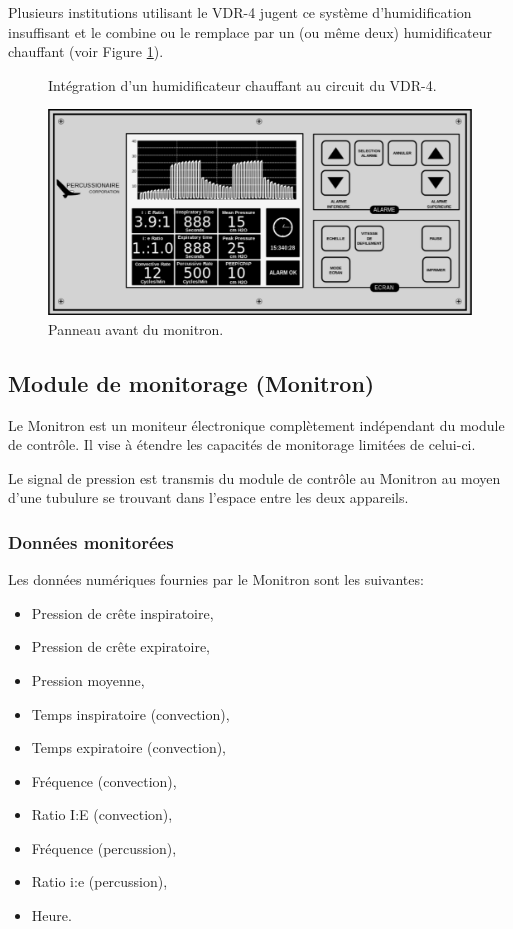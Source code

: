 Plusieurs institutions utilisant le VDR-4 jugent ce système 
d'humidification insuffisant et le combine ou le remplace par un 
(ou même deux) humidificateur chauffant (voir Figure \ref{fig:circ}).

\begin{figure}
	\begin{wide}
	
	\caption{Intégration d'un humidificateur chauffant au circuit du VDR-4.}
	\label{fig:circ}
	\end{wide}
\end{figure}

\begin{figure}
	\includegraphics[width=\textwidth]{img/Monitron}
	\caption{Panneau avant du monitron.}
\end{figure}
\subsection{Module de monitorage (Monitron)}

Le Monitron est un moniteur électronique complètement indépendant du
module de contrôle. Il vise à étendre les capacités de monitorage
limitées de celui-ci.

Le signal de pression est transmis du module de contrôle au Monitron
au moyen d'une tubulure se trouvant dans l'espace entre les deux
appareils.

\subsubsection{Données monitorées}

Les données numériques fournies par le Monitron sont les suivantes:

\begin{itemize}
\item Pression de crête inspiratoire,
\item Pression de crête expiratoire,
\item Pression moyenne,
\item Temps inspiratoire (convection),
\item Temps expiratoire (convection),
\item Fréquence (convection),
\item Ratio I:E (convection),
\item Fréquence (percussion),
\item Ratio i:e (percussion),
\item Heure.
\end{itemize}


